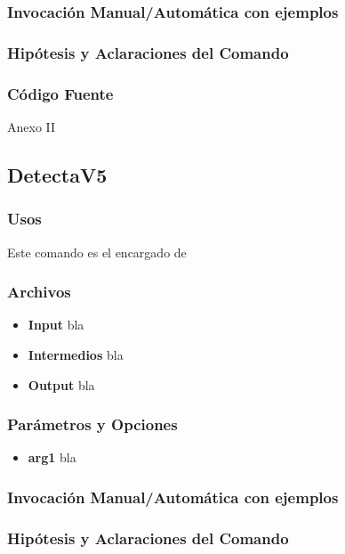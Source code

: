 \documentclass[a4paper,10pt,titlepage]{article}
\begin{document}
		\subsubsection{Invocaci\'on Manual/Autom\'atica con ejemplos}

		\subsubsection{Hip\'otesis y Aclaraciones del Comando}

		\subsubsection{C\'odigo Fuente}
			Anexo II


	\subsection{DetectaV5}
		\subsubsection{Usos}
		Este comando es el encargado de 
			 

		\subsubsection{Archivos}
			\begin {itemize}
				\item \textbf{Input} {bla}
				\item \textbf{Intermedios} {bla}
				\item \textbf{Output} {bla}
			\end{itemize}

		\subsubsection{Par\'ametros y Opciones}
			\begin {itemize}
				\item \textbf{arg1} {bla}
			\end{itemize}
	
		\subsubsection{Invocaci\'on Manual/Autom\'atica con ejemplos}

		\subsubsection{Hip\'otesis y Aclaraciones del Comando}
\end{document}
